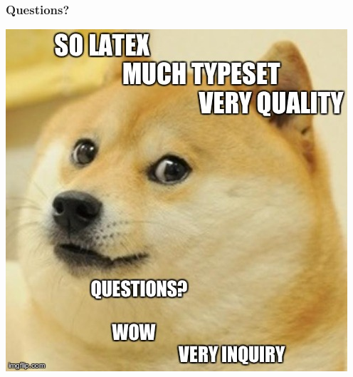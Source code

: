 \documentclass[notes=only]{beamer}
\begin{document}
\begin{frame} \frametitle{Questions?}
\begin{center}
	\includegraphics[width=.7\textwidth]{Resources/doge.jpg}
	\end{center}
\end{frame}
\end{document}
